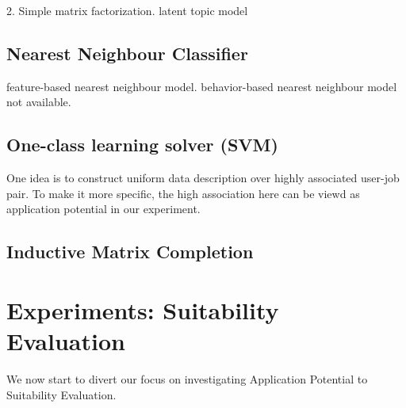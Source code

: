 \documentclass{article} %
\begin{document}
2. Simple matrix factorization. latent topic model 

\subsection{Nearest Neighbour Classifier} %
feature-based nearest neighbour model. behavior-based nearest neighbour model
not available.

\subsection{One-class learning solver (SVM)} %
One idea is to construct uniform data description over highly associated
user-job pair. To make it more specific, the high association here can be
viewd as application potential in our experiment.

\subsection{Inductive Matrix Completion} %


\section{Experiments: Suitability Evaluation}
We now start to divert our focus on investigating Application Potential to
Suitability Evaluation.

{}

\end{document}
